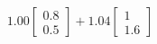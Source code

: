 \documentclass[preview]{standalone}
\begin{document}
\begin{align*}
1.00 \begin{bmatrix} 0.8 \\ 0.5 \end{bmatrix} + 1.04 \begin{bmatrix} 1 \\ 1.6 \end{bmatrix}
\end{align*}
\end{document}
